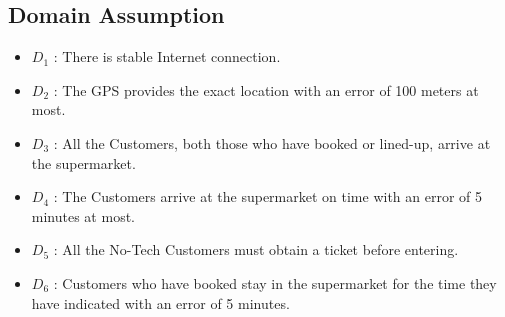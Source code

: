 \subsection{Domain Assumption}

\begin{itemize}
	\item $D_1$ : There is stable Internet connection.
	\item $D_2$ : The GPS provides the exact location with an error of 100 meters at most.
	\item $D_3$ : All the Customers, both those who have booked or lined-up, arrive at the supermarket.
	\item $D_4$ : The Customers arrive at the supermarket on time with an error of 5 minutes at most.
	\item $D_5$ : All the No-Tech Customers must obtain a ticket before entering.
	\item $D_6$ : Customers who have booked stay in the supermarket for the time they have indicated with an error of 5 minutes. 
\end{itemize}
 



